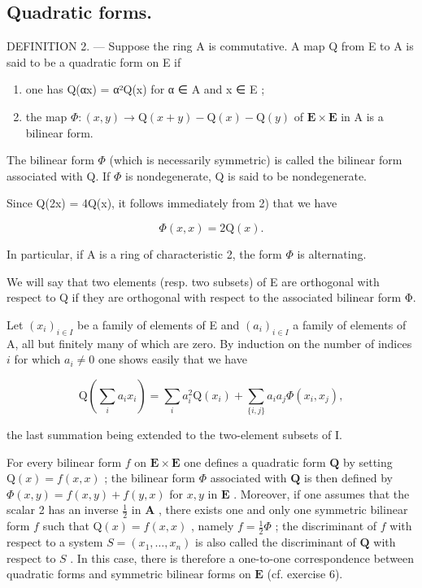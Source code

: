 \subsection{Quadratic forms.}

DEFINITION 2. --- Suppose the ring A is commutative. A map Q from E to A is said to be a quadratic form on E if

\begin{enumerate}
\def\labelenumi{\arabic{enumi})}
\item
  one has Q(αx) = α²Q(x) for α ∈ A and x ∈ E ;
\item
  the map \(\Phi : (x, y) \to \mathrm{Q}(x + y) - \mathrm{Q}(x) - \mathrm{Q}(y)\) of \(\mathbf{E} \times \mathbf{E}\) in A is a bilinear form.
\end{enumerate}

The bilinear form \(\Phi\) (which is necessarily symmetric) is called the bilinear form associated with Q. If \(\Phi\) is nondegenerate, Q is said to be nondegenerate.

Since Q(2x) = 4Q(x), it follows immediately from 2) that we have

\[
\Phi (x, x) = 2 \mathrm{Q} (x).\tag{13}
\]

In particular, if A is a ring of characteristic 2, the form \(\Phi\) is alternating.

We will say that two elements (resp. two subsets) of E are orthogonal with respect to Q if they are orthogonal with respect to the associated bilinear form Φ.

Let \((x_{i})_{i\in I}\) be a family of elements of E and \((a_{i})_{i\in I}\) a family of elements of A, all but finitely many of which are zero. By induction on the number of indices \(i\) for which \(a_{i}\neq0\) one shows easily that we have

\[
\mathrm{Q} (\sum_ {i} a _ {i} x _ {i}) = \sum_ {i} a _ {i} ^ {2} \mathrm{Q} (x _ {i}) + \sum_ {\{i, j \}} a _ {i} a _ {j} \Phi (x _ {i}, x _ {j}),\tag{14}
\]

the last summation being extended to the two-element subsets of I.

For every bilinear form \(f\) on \(\mathbf{E} \times \mathbf{E}\) one defines a quadratic form \(\mathbf{Q}\) by setting \(\mathrm{Q}(x) = f(x, x)\) ; the bilinear form \(\Phi\) associated with \(\mathbf{Q}\) is then defined by \(\Phi(x, y) = f(x, y) + f(y, x)\) for \(x, y\) in \(\mathbf{E}\) . Moreover, if one assumes that the scalar 2 has an inverse \(\frac{1}{2}\) in \(\mathbf{A}\) , there exists one and only one symmetric bilinear form \(f\) such that \(\mathrm{Q}(x) = f(x, x)\) , namely \(f = \frac{1}{2}\Phi\) ; the discriminant of \(f\) with respect to a system \(S = (x_1, \ldots, x_n)\) is also called the discriminant of \(\mathbf{Q}\) with respect to \(S\) . In this case, there is therefore a one-to-one correspondence between quadratic forms and symmetric bilinear forms on \(\mathbf{E}\) (cf. exercise 6).

